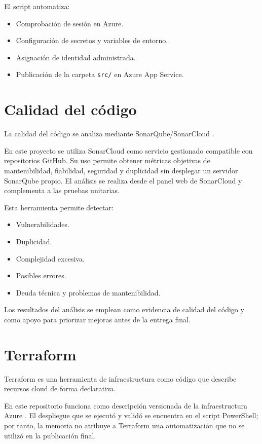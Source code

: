 El script automatiza:

\begin{itemize}
    \item Comprobación de sesión en Azure.
    \item Configuración de secretos y variables de entorno.
    \item Asignación de identidad administrada.
    \item Publicación de la carpeta \texttt{src/} en Azure App Service.
\end{itemize}

\section{Calidad del código}

La calidad del código se analiza mediante SonarQube/SonarCloud \cite{sonarqube_docs}.

En este proyecto se utiliza SonarCloud como servicio gestionado compatible con repositorios GitHub. Su uso permite obtener métricas objetivas de mantenibilidad, fiabilidad, seguridad y duplicidad sin desplegar un servidor SonarQube propio. El análisis se realiza desde el panel web de SonarCloud y complementa a las pruebas unitarias.

Esta herramienta permite detectar:

\begin{itemize}
    \item Vulnerabilidades.
    \item Duplicidad.
    \item Complejidad excesiva.
    \item Posibles errores.
    \item Deuda técnica y problemas de mantenibilidad.
\end{itemize}

Los resultados del análisis se emplean como evidencia de calidad del código y como apoyo para priorizar mejoras antes de la entrega final.

\section{Terraform}

Terraform es una herramienta de infraestructura como código que describe recursos cloud de forma declarativa.

En este repositorio funciona como descripción versionada de la infraestructura Azure \cite{terraform_azure}. El despliegue que se ejecutó y validó se encuentra en el script PowerShell; por tanto, la memoria no atribuye a Terraform una automatización que no se utilizó en la publicación final.
